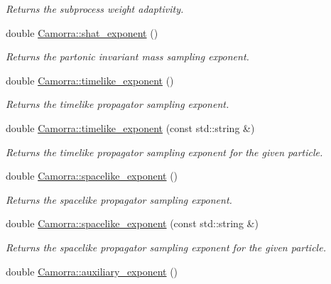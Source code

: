 \begin{DoxyCompactItemize}
\begin{DoxyCompactList}\small\item\em Returns the subprocess weight adaptivity. \end{DoxyCompactList}\item 
\hypertarget{a00800_aa340a7a07cd22c94638bcce39532a92b}{
double \hyperlink{a00800_aa340a7a07cd22c94638bcce39532a92b}{Camorra::shat\_\-exponent} ()}
\label{a00800_aa340a7a07cd22c94638bcce39532a92b}

\begin{DoxyCompactList}\small\item\em Returns the partonic invariant mass sampling exponent. \end{DoxyCompactList}\item 
\hypertarget{a00800_a35d1bbad2438b461f5db90b09f6346bf}{
double \hyperlink{a00800_a35d1bbad2438b461f5db90b09f6346bf}{Camorra::timelike\_\-exponent} ()}
\label{a00800_a35d1bbad2438b461f5db90b09f6346bf}

\begin{DoxyCompactList}\small\item\em Returns the timelike propagator sampling exponent. \end{DoxyCompactList}\item 
double \hyperlink{a00800_abb4b7da6eef370b5176541d2056ca039}{Camorra::timelike\_\-exponent} (const std::string \&)
\begin{DoxyCompactList}\small\item\em Returns the timelike propagator sampling exponent for the given particle. \end{DoxyCompactList}\item 
\hypertarget{a00800_a287ab4732362246bdd4b763bd22e957f}{
double \hyperlink{a00800_a287ab4732362246bdd4b763bd22e957f}{Camorra::spacelike\_\-exponent} ()}
\label{a00800_a287ab4732362246bdd4b763bd22e957f}

\begin{DoxyCompactList}\small\item\em Returns the spacelike propagator sampling exponent. \end{DoxyCompactList}\item 
double \hyperlink{a00800_adf0a6d2624d3e2937bc5f180c0a5d3dc}{Camorra::spacelike\_\-exponent} (const std::string \&)
\begin{DoxyCompactList}\small\item\em Returns the spacelike propagator sampling exponent for the given particle. \end{DoxyCompactList}\item 
\hypertarget{a00800_ae2574c2de709f48846ef66865357b28c}{
double \hyperlink{a00800_ae2574c2de709f48846ef66865357b28c}{Camorra::auxiliary\_\-exponent} ()}
\label{a00800_ae2574c2de709f48846ef66865357b28c}


\end{DoxyCompactItemize}
